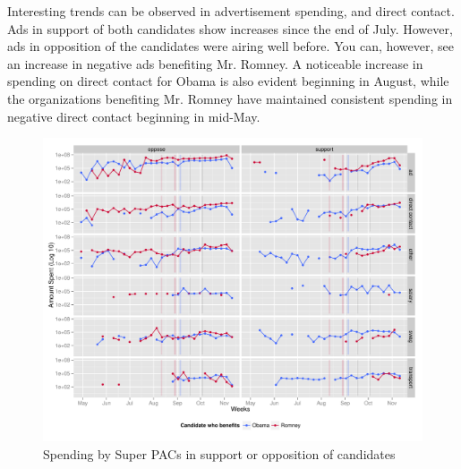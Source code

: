 \documentclass[11pt]{article}\usepackage{graphicx, color}
\newenvironment{knitrout}{}{} %
\begin{document}
Interesting trends can be observed in advertisement spending, and direct contact. Ads in support of both candidates show increases since the end of July. However, ads in opposition of the candidates were airing well before. You can, however, see an increase in negative ads benefiting Mr. Romney. A noticeable increase in spending on direct contact for Obama is also evident beginning in August, while the organizations benefiting Mr. Romney have maintained consistent spending in negative direct contact beginning in mid-May.

\begin{knitrout}
\color{fgcolor}\begin{figure}[H]


{\centering \includegraphics[width=\textwidth]{figure/temporal_plot} 

}

\caption[Spending by Super PACs in support or opposition of candidates]{Spending by Super PACs in support or opposition of candidates\label{fig:temporal_plot}}
\end{figure}

\end{knitrout}
\end{document}
